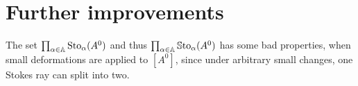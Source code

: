 \begin{comment}
  This element is explicitly given as
  \begin{align*}
    &\left(
      \begin{pmatrix}
          1 & {}^1c_2 t^{l_2-l_1}e^{(q_2-q_1)(t^{-1})}
            & {}^1c_3 t^{l_3-l_1}e^{(q_3-q_1)(t^{-1})}
        \\0 & 1 & {}^1c_1 t^{l_3-l_2}e^{(q_3-q_2)(t^{-1})}
        \\0 & 0 & 1
      \end{pmatrix},
      \cY_0^{-1}
      \begin{pmatrix}
          1 & 0 & 0
        \\{}^2c_2 & 1 & 0
        \\{}^2c_3 & 0 & 1
      \end{pmatrix}
      \cY_0
      ,
    \right.
  \\&\qquad
      \cY_0^{-1}
      \begin{pmatrix}
          1 & {}^3c_2 & {}^3c_3
        \\0 & 1 & 0
        \\0 & 0 & 1
      \end{pmatrix}
      \cY_0
      ,
      \cY_0^{-1}
      \begin{pmatrix}
          1 & 0 & 0
        \\{}^4c_2 & 1 & 0
        \\{}^2c_1{}^4c_2+{}^4c_3 & {}^2c_1 & 1
      \end{pmatrix}
      \cY_0
      ,
  \\&\qquad\qquad
    \left.
      \cY_0^{-1}
      \begin{pmatrix}
          1 & {}^5c_2 & {}^5c_3
        \\0 & 1 & 0
        \\0 & 0 & 1
      \end{pmatrix}
      \cY_0
      ,
      \cY_0^{-1}
      \begin{pmatrix}
          1 & 0 & 0
        \\{}^{\zkTwo}c_2 & 1 & 0
        \\{}^{\zkTwo}c_3 & 0 & 1
      \end{pmatrix}
      \cY_0
    \right)
    \in
    \prod_{\alpha\in\A}\Sto_{\alpha}(A^0) \,.
  \end{align*}
\end{comment}

\section{Further improvements}\label{sec:furtherImprovements}
The set $\prod_{\alpha\in\mathbb{A}}\operatorname{Sto}_\alpha(A^0)$ and thus
$\prod_{\alpha\in\mathbb{A}}\operatorname{\mathbb{S}to}_\alpha(A^0)$ has some bad properties, when small
deformations are applied to $[A^0]$, since under arbitrary small changes, one
Stokes ray can split into two.

